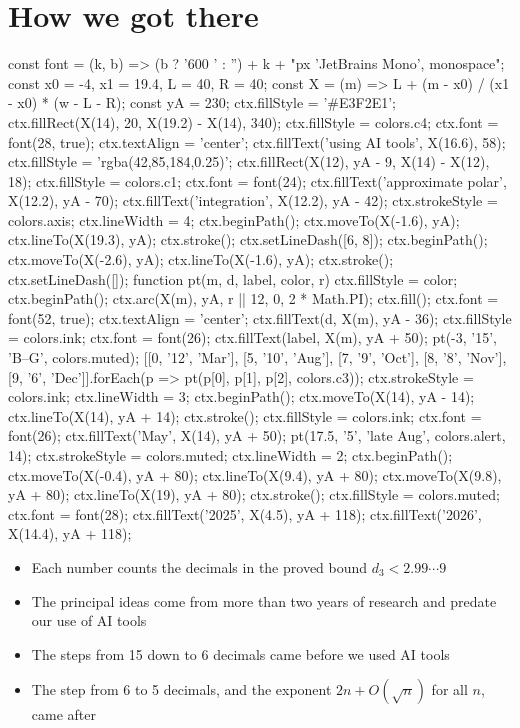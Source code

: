 \section*{How we got there}
\begin{js}[size=1680x430, frames=1, alt="Timeline of the number of decimals in the proved bound on d_3: 15 (Badger–Genschaw), then 12 in March 2025, 10 in August, 9 in October, 8 in November, 6 in December 2025, approximate polar integration in spring 2026, and 5 in late August 2026, after AI tools came into use in May 2026"]
const font = (k, b) => (b ? '600 ' : '') + k + "px 'JetBrains Mono', monospace";
const x0 = -4, x1 = 19.4, L = 40, R = 40;
const X = (m) => L + (m - x0) / (x1 - x0) * (w - L - R);
const yA = 230;
ctx.fillStyle = '#E3F2E1'; ctx.fillRect(X(14), 20, X(19.2) - X(14), 340);
ctx.fillStyle = colors.c4; ctx.font = font(28, true); ctx.textAlign = 'center';
ctx.fillText('using AI tools', X(16.6), 58);
ctx.fillStyle = 'rgba(42,85,184,0.25)'; ctx.fillRect(X(12), yA - 9, X(14) - X(12), 18);
ctx.fillStyle = colors.c1; ctx.font = font(24); ctx.fillText('approximate polar', X(12.2), yA - 70); ctx.fillText('integration', X(12.2), yA - 42);
ctx.strokeStyle = colors.axis; ctx.lineWidth = 4;
ctx.beginPath(); ctx.moveTo(X(-1.6), yA); ctx.lineTo(X(19.3), yA); ctx.stroke();
ctx.setLineDash([6, 8]); ctx.beginPath(); ctx.moveTo(X(-2.6), yA); ctx.lineTo(X(-1.6), yA); ctx.stroke(); ctx.setLineDash([]);
function pt(m, d, label, color, r) {
  ctx.fillStyle = color; ctx.beginPath(); ctx.arc(X(m), yA, r || 12, 0, 2 * Math.PI); ctx.fill();
  ctx.font = font(52, true); ctx.textAlign = 'center'; ctx.fillText(d, X(m), yA - 36);
  ctx.fillStyle = colors.ink; ctx.font = font(26); ctx.fillText(label, X(m), yA + 50);
}
pt(-3, '15', 'B–G', colors.muted);
[[0, '12', 'Mar'], [5, '10', 'Aug'], [7, '9', 'Oct'], [8, '8', 'Nov'], [9, '6', 'Dec']].forEach(p => pt(p[0], p[1], p[2], colors.c3));
ctx.strokeStyle = colors.ink; ctx.lineWidth = 3; ctx.beginPath(); ctx.moveTo(X(14), yA - 14); ctx.lineTo(X(14), yA + 14); ctx.stroke();
ctx.fillStyle = colors.ink; ctx.font = font(26); ctx.fillText('May', X(14), yA + 50);
pt(17.5, '5', 'late Aug', colors.alert, 14);
ctx.strokeStyle = colors.muted; ctx.lineWidth = 2;
ctx.beginPath(); ctx.moveTo(X(-0.4), yA + 80); ctx.lineTo(X(9.4), yA + 80); ctx.moveTo(X(9.8), yA + 80); ctx.lineTo(X(19), yA + 80); ctx.stroke();
ctx.fillStyle = colors.muted; ctx.font = font(28); ctx.fillText('2025', X(4.5), yA + 118); ctx.fillText('2026', X(14.4), yA + 118);
\end{js}
\begin{itemize}
\item Each number counts the decimals in the proved bound $d_3<2.99\cdots9$
\item The principal ideas come from more than two years of research and predate our use of AI tools
\item The steps from 15 down to 6 decimals came before we used AI tools
\item The step from 6 to 5 decimals, and the exponent $2n+O(\sqrt n)$ for all $n$, came after
\end{itemize}

